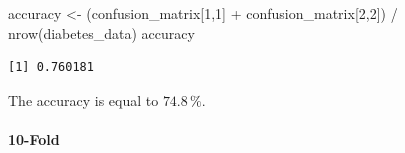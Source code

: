 \documentclass[
]{article}
\newenvironment{Shaded}{\begin{snugshade}}{\end{snugshade}}
\newcommand{\DecValTok}[1]{\textcolor[rgb]{0.00,0.00,0.81}{#1}}
\newcommand{\FunctionTok}[1]{\textcolor[rgb]{0.00,0.00,0.00}{#1}}
\newcommand{\NormalTok}[1]{#1}
\newcommand{\OtherTok}[1]{\textcolor[rgb]{0.56,0.35,0.01}{#1}}
\newcommand{\SpecialCharTok}[1]{\textcolor[rgb]{0.00,0.00,0.00}{#1}}
\begin{document}
\begin{Shaded}
\begin{Highlighting}[]
\NormalTok{accuracy }\OtherTok{\textless{}{-}}\NormalTok{ (confusion\_matrix[}\DecValTok{1}\NormalTok{,}\DecValTok{1}\NormalTok{] }\SpecialCharTok{+}\NormalTok{ confusion\_matrix[}\DecValTok{2}\NormalTok{,}\DecValTok{2}\NormalTok{]) }\SpecialCharTok{/} \FunctionTok{nrow}\NormalTok{(diabetes\_data)}
\NormalTok{accuracy}
\end{Highlighting}
\end{Shaded}

\begin{verbatim}
[1] 0.760181
\end{verbatim}

The accuracy is equal to \(74.8\,\%\).

\hypertarget{fold-1}{%
\paragraph{10-Fold}\label{fold-1}}
\end{document}
